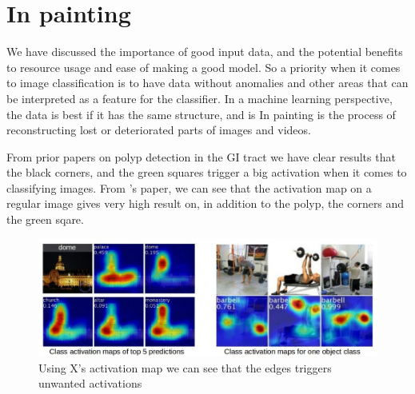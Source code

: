 \section{In painting}
  We have discussed the importance of good input data, and the potential benefits to resource usage and ease of making a good model.
  So a priority when it comes to image classification is to have data without anomalies and other areas that can be interpreted as a feature for the classifier. 
  In a machine learning perspective, the data is best if it has the same structure, and is %
  In painting is the process of reconstructing lost or deteriorated parts of images and videos. %
  

  From prior papers on polyp detection in the GI tract %
  we have clear results that the black corners, and the green squares trigger a big activation %
  when it comes to classifying images. 
  From %
  's paper, we can see that the activation map on a regular image gives very high result on, in addition to the polyp, the corners and the green sqare. 
  \begin{figure}[ht]
    \centering
    \includegraphics[scale=0.5]{background/figures/placeholder.jpeg}
    \caption{Using X's activation map we can see that the edges triggers unwanted activations}
  \end{figure}
  
